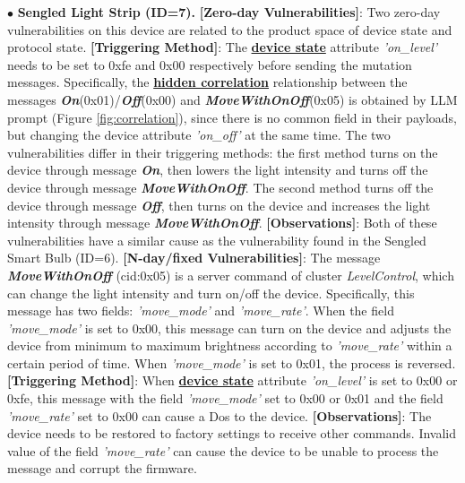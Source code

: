 \documentclass[10pt,journal,compsoc]{IEEEtran}
\begin{document}
$\bullet$ \textbf{Sengled Light Strip (ID=7).} \textbf{[Zero-day Vulnerabilities]}: Two zero-day vulnerabilities on this device are related to the product space of device state and protocol state. \textbf{[Triggering Method]}: The \underline{\textbf{device state}} attribute \textit{'on\_level'} needs to be set to 0xfe and 0x00 respectively before sending the mutation messages. Specifically, the \underline{\textbf{hidden correlation}} relationship between the messages \textbf{\textit{On}}(0x01)/\textbf{\textit{Off}}(0x00) and \textbf{\textit{MoveWithOnOff}}(0x05) is obtained by LLM prompt (Figure \ref{fig:correlation}), since there is no common field in their payloads, but changing the device attribute \textit{'on\_off'} at the same time. The two vulnerabilities differ in their triggering methods: the first method turns on the device through message \textbf{\textit{On}}, then lowers the light intensity and turns off the device through message \textbf{\textit{MoveWithOnOff}}. The second method turns off the device through message \textbf{\textit{Off}}, then turns on the device and increases the light intensity through message \textbf{\textit{MoveWithOnOff}}. \textbf{[Observations]}: Both of these vulnerabilities have a similar cause as the vulnerability found in the Sengled Smart Bulb (ID=6).  \textbf{[N-day/fixed Vulnerabilities]}: The message \textbf{\textit{MoveWithOnOff}} (cid:0x05) is a server command of cluster \textit{LevelControl}, which can change the light intensity and turn on/off the device. Specifically, this message has two fields:  \textit{'move\_mode'} and \textit{'move\_rate'}. When the field \textit{'move\_mode'} is set to 0x00, this message can turn on the device and adjusts the device from minimum to maximum brightness according to \textit{'move\_rate'} within a certain period of time. When \textit{'move\_mode'} is set to 0x01, the process is reversed. \textbf{[Triggering Method]}: When \underline{\textbf{device state}} attribute \textit{'on\_level'} is set to 0x00 or 0xfe, this message with the field \textit{'move\_mode'} set to 0x00 or 0x01 and the field \textit{'move\_rate'} set to 0x00 can cause a Dos to the device. \textbf{[Observations]}:
The device needs to be restored to factory settings to receive other commands. Invalid value of the field \textit{'move\_rate'} can cause the device to be unable to process the message and corrupt the firmware.
\end{document}
